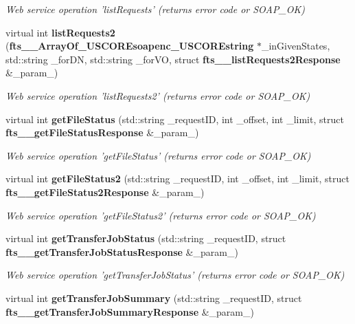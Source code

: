 \begin{DoxyCompactItemize}
\begin{DoxyCompactList}\small\item\em Web service operation 'listRequests' (returns error code or SOAP\_\-OK) \item\end{DoxyCompactList}\item 
virtual int {\bf listRequests2} ({\bf fts\_\-\_\-ArrayOf\_\-USCOREsoapenc\_\-USCOREstring} $\ast$\_\-inGivenStates, std::string \_\-forDN, std::string \_\-forVO, struct {\bf fts\_\-\_\-listRequests2Response} \&\_\-param\_)\label{classFileTransferSoapBindingProxy_a12e598eb0f9a15ca04e46c8f0ff69518}

\begin{DoxyCompactList}\small\item\em Web service operation 'listRequests2' (returns error code or SOAP\_\-OK) \item\end{DoxyCompactList}\item 
virtual int {\bf getFileStatus} (std::string \_\-requestID, int \_\-offset, int \_\-limit, struct {\bf fts\_\-\_\-getFileStatusResponse} \&\_\-param\_)\label{classFileTransferSoapBindingProxy_ab374cacbbe79e006fd6781814e7bccee}

\begin{DoxyCompactList}\small\item\em Web service operation 'getFileStatus' (returns error code or SOAP\_\-OK) \item\end{DoxyCompactList}\item 
virtual int {\bf getFileStatus2} (std::string \_\-requestID, int \_\-offset, int \_\-limit, struct {\bf fts\_\-\_\-getFileStatus2Response} \&\_\-param\_)\label{classFileTransferSoapBindingProxy_abdc6d108208bad5b1d8ea78f34499f5c}

\begin{DoxyCompactList}\small\item\em Web service operation 'getFileStatus2' (returns error code or SOAP\_\-OK) \item\end{DoxyCompactList}\item 
virtual int {\bf getTransferJobStatus} (std::string \_\-requestID, struct {\bf fts\_\-\_\-getTransferJobStatusResponse} \&\_\-param\_)\label{classFileTransferSoapBindingProxy_a8db5bbfc833a80420e544f6d5dd6444a}

\begin{DoxyCompactList}\small\item\em Web service operation 'getTransferJobStatus' (returns error code or SOAP\_\-OK) \item\end{DoxyCompactList}\item 
virtual int {\bf getTransferJobSummary} (std::string \_\-requestID, struct {\bf fts\_\-\_\-getTransferJobSummaryResponse} \&\_\-param\_)\label{classFileTransferSoapBindingProxy_a1784d9f9e8c70d62e2cf68f8c0229829}


\end{DoxyCompactItemize}
